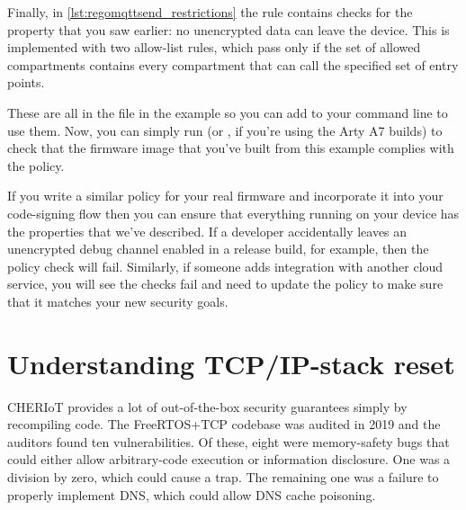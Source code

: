 \regolisting[filename=examples/mqtt/mqtt.rego,marker=connection_capabilities,label=lst:regomqttconnection_capabilities,caption="Rego rules for restricting output in the MQTT example."]{}

Finally, in \ref{lst:regomqttsend_restrictions} the rule contains checks for the property that you saw earlier: no unencrypted data can leave the device.
This is implemented with two allow-list rules, which pass only if the set of allowed compartments contains every compartment that can call the specified set of entry points.

\regolisting[filename=examples/mqtt/mqtt.rego,marker=send_restrictions,label=lst:regomqttsend_restrictions,caption="Rego rules to ensure that no data leaves the device unencrypted for the MQTT example."]{}

These are all in the  file in the example so you can add  to your  command line to use them.
Now, you can simply run  (or , if you're using the Arty A7 builds) to check that the firmware image that you've built from this example complies with the policy.

If you write a similar policy for your real firmware and incorporate it into your code-signing flow then you can ensure that everything running on your device has the properties that we've described.
If a developer accidentally leaves an unencrypted debug channel enabled in a release build, for example, then the policy check will fail.
Similarly, if someone adds integration with another cloud service, you will see the checks fail and need to update the policy to make sure that it matches your new security goals.

\section[label=netreset]{Understanding TCP/IP-stack reset}

CHERIoT provides a lot of out-of-the-box security guarantees simply by recompiling code.
The FreeRTOS+TCP codebase was audited in 2019 and the auditors found ten vulnerabilities.
Of these, eight were memory-safety bugs that could either allow arbitrary-code execution or information disclosure.
One was a division by zero, which could cause a trap.
The remaining one was a failure to properly implement DNS, which could allow DNS cache poisoning.

